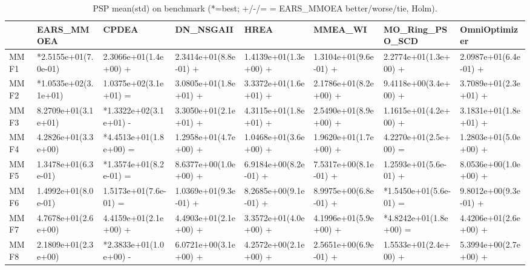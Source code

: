 \begin{table}[t]
\centering
\caption{PSP mean(std) on benchmark (*=best; +/-/= = EARS_MMOEA better/worse/tie, Holm).}
\label{tab:benchmark_PSP}
\begin{tabular}{llllllll}
\toprule
 & EARS\_MMOEA & CPDEA & DN\_NSGAII & HREA & MMEA\_WI & MO\_Ring\_PSO\_SCD & OmniOptimizer \\
\midrule
MMF1 & *2.5155e+01(7.0e-01) & 2.3066e+01(1.4e+00) + & 2.3414e+01(8.8e-01) + & 1.4139e+01(1.3e+00) + & 1.3104e+01(9.6e-01) + & 2.2774e+01(1.3e+00) + & 2.0987e+01(6.4e-01) + \\
MMF2 & *1.0535e+02(3.1e+01) & 1.0375e+02(3.1e+01) = & 3.0805e+01(1.8e+01) + & 3.3372e+01(1.6e+01) + & 2.1786e+01(8.2e+00) + & 9.4118e+00(3.4e+00) + & 3.7089e+01(2.3e+01) + \\
MMF3 & 8.2709e+01(3.1e+01) & *1.3322e+02(3.1e+01) - & 3.3050e+01(2.1e+01) + & 4.3115e+01(1.8e+01) + & 2.5490e+01(8.9e+00) + & 1.1615e+01(4.2e+00) + & 3.1831e+01(1.8e+01) + \\
MMF4 & 4.2826e+01(3.3e+00) & *4.4513e+01(1.8e+00) = & 1.2958e+01(4.7e+00) + & 1.0468e+01(3.6e+00) + & 1.9620e+01(1.7e+00) + & 4.2270e+01(2.5e+00) = & 1.2803e+01(5.0e+00) + \\
MMF5 & 1.3478e+01(6.3e-01) & *1.3574e+01(8.2e-01) = & 8.6377e+00(1.0e+00) + & 6.9184e+00(8.2e-01) + & 7.5317e+00(8.1e-01) + & 1.2593e+01(5.6e-01) + & 8.0536e+00(1.0e+00) + \\
MMF6 & 1.4992e+01(8.0e-01) & 1.5173e+01(7.6e-01) = & 1.0369e+01(9.3e-01) + & 8.2685e+00(9.1e-01) + & 8.9975e+00(6.8e-01) + & *1.5450e+01(5.6e-01) = & 9.8012e+00(9.3e-01) + \\
MMF7 & 4.7678e+01(2.6e+00) & 4.4159e+01(2.1e+00) + & 4.4903e+01(2.1e+00) + & 3.3572e+01(4.0e+00) + & 4.1996e+01(5.9e+00) + & *4.8242e+01(1.8e+00) = & 4.4206e+01(2.6e+00) + \\
MMF8 & 2.1809e+01(2.3e+00) & *2.3833e+01(1.0e+00) - & 6.0721e+00(3.1e+00) + & 4.2572e+00(2.1e+00) + & 2.5651e+00(6.9e-01) + & 1.5533e+01(2.4e+00) + & 5.3994e+00(2.7e+00) + \\
\bottomrule
\end{tabular}
\end{table}
